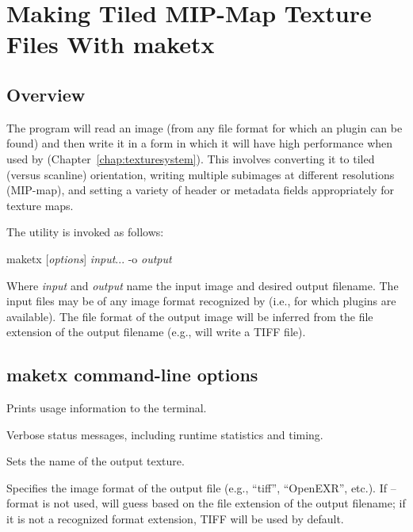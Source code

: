 \chapter{Making Tiled MIP-Map Texture Files With {\cf maketx}}
\label{chap:maketx}

\section{Overview}

The \maketx program will read an image (from any file format for
which an \ImageInput plugin can be found) and then write it in a form
in which it will have high performance when used by \TextureSystem
(Chapter~\ref{chap:texturesystem}).  This involves converting it to
tiled (versus scanline) orientation, writing multiple subimages at
different resolutions (MIP-map), and setting a variety of header or
metadata fields appropriately for texture maps.

The \maketx utility is invoked as follows:

\medskip

\hspace{0.25in} {\cf maketx} [\emph{options}] \emph{input}... -o \emph{output}

\medskip

Where \emph{input} and \emph{output} name the input image and desired
output filename.  The input files may be of any image format recognized by
\product (i.e., for which \ImageInput plugins are available).  The file
format of the output image will be inferred from the file extension of
the output filename (e.g.,  will write a TIFF file).


\section{{\cf maketx} command-line options}

Prints usage information to the terminal.
\apiend

Verbose status messages, including runtime statistics and timing.
\apiend

Sets the name of the output texture.
\apiend

Specifies the image format of the output file (e.g., ``tiff'',
``OpenEXR'', etc.).  If {\cf --format} is not used, \maketx will 
guess based on the file extension of the output filename; if it
is not a recognized format extension, TIFF will be used by default.
\apiend

